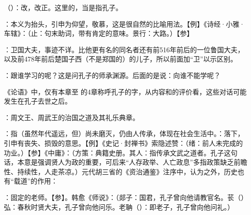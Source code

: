 {
\item {}（）：改，改正。这里的，当是指孔子。
\item {}：本义为抬头，引申为仰望，敬慕，这是很自然的比喻用法。【例】《诗经·小雅·车辖》：（止：句末助词，带有肯定的意味。景行：大路。）【参】
}
{}


{
\item {}：卫国大夫，事迹不详。比他更有名的同名者还有前516年前后的一位鲁国大夫，以及前478年前后楚国子西（不是郑国的）的儿子，所以前面加“卫”以示区别。
\item {}：跟谁学习的呢？这是问孔子的师承渊源。后面的是说：向谁不能学呢？

《论语》中，仅有本章至  的4章称呼孔子的字，从内容和的评价看，这些对话可能发生在孔子去世之后。
\item {}：周文王、周武王的治国之道及其礼乐典章。
\item {}：指（虽然年代遥远，但）尚未磨灭，仍由人传承，体现在社会生活中。：落下，引申有丧失、损毁的意思。【例】《史记·封禅书》索隐述赞：（绪：前人未完成的功业。）【参】《中庸》：（方策：典籍史册。其人：指传承文武之道者。孔子这句话，本意是强调贤人为政的重要，可后来“人存政举、人亡政息”多指政策缺乏前瞻性、持续性，人走茶凉。）元代胡三省的《资治通鉴》注序中，认为之外，历史也有“载道”的作用：
\item {}：固定的老师。【参】。韩愈《师说》：（郯子：国君，孔子曾向他请教官名。苌（）弘：春秋时贤大夫，孔子曾向他问乐。老聃（）：即老子，孔子曾向他问礼。）
}
{}


